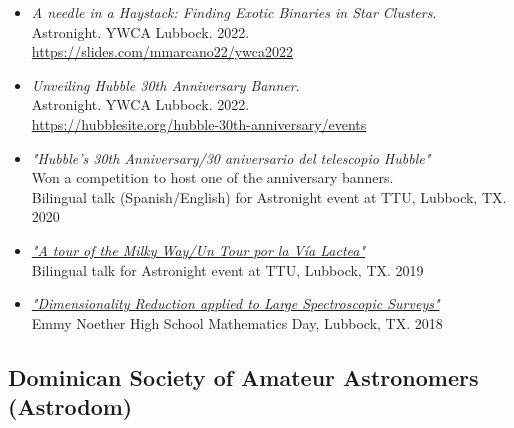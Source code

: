 \documentclass[letterpaper,10pt]{article}
\begin{document}
\begin{itemize}[label=$\blacktriangleright$]

	\item \textit{A needle in a Haystack: Finding Exotic Binaries in Star Clusters}. \\
Astronight. YWCA Lubbock. 2022. \\
\url{https://slides.com/mmarcano22/ywca2022}



	\item \textit{Unveiling Hubble 30th Anniversary Banner}. \\
Astronight. YWCA Lubbock. 2022. \\
\url{https://hubblesite.org/hubble-30th-anniversary/events}



	\item \textit{"Hubble's 30th Anniversary/30 aniversario del telescopio Hubble"} \\ Won a competition to host one of the anniversary banners. \\ Bilingual talk (Spanish/English) for Astronight event at TTU, Lubbock, TX. 2020
	



	\item \textit{\href{https://slides.com/mmarcano22/a-tour-of-the-milky-way-2\#/}{"A tour of the Milky Way/Un Tour por la V\'ia Lactea"}} \\ Bilingual talk for Astronight event at TTU, Lubbock, TX. 2019


	\item \textit{\href{http://manuelpm.me/PCASDSS/}{"Dimensionality Reduction applied to Large Spectroscopic Surveys"}} \\ Emmy Noether High School Mathematics Day, Lubbock, TX. 2018




\end{itemize}


\subsection*{Dominican Society of Amateur Astronomers (Astrodom)}
\end{document}

